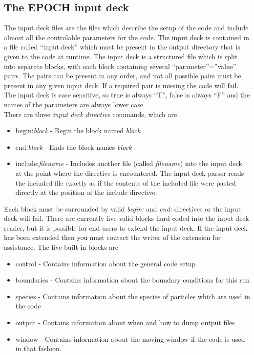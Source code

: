 \documentclass[12pt]{article}
\newcommand{\EPOCH}{{\color{warwickdark}\fontfamily{phv}\selectfont EPOCH} }
\begin{document}
\subsection{The \EPOCH input deck}
The input deck files are the files which describe the setup of the code and
include almost all the controlable parameters for the code. The input deck is
contained in a file called ``input.deck'' which must be present in the output
directory that is given to the code at runtime. The input deck is a structured
file which is split into separate blocks, with each block containing several
``parameter''=''value'' pairs. The pairs can be present in any order, and not
all possible pairs must be present in any given input deck. If a required pair
is missing the code will fail. The input deck is case sensitive, so true is
always ``T'', false is always ``F'' and the names of the parameters are always
lower case.\\

There are three {\it input deck directive} commands, which are
\begin{itemize}
\item begin:{\it block} - Begin the block named {\it block}
\item end:{\it block} - Ends the block names {\it block}
\item include:{\it filename} - Includes another file (called {\it filename})
  into the input deck at the point where the directive is encountered. The
  input deck parser reads the included file exactly as if the contents of the
  included file were pasted directly at the position of the include directive.
\end{itemize}
Each block must be surrounded by valid {\it begin:} and {\it end:} directives
or the input deck will fail. There are currently five valid blocks hard coded
into the input deck reader, but it is possible for end users to extend the
input deck. If the input deck has been extended then you must contact the
writer of the extension for assistance. The five built in blocks are
\begin{itemize}
\item control - Contains information about the general code setup
\item boundaries - Contains information about the boundary conditions for this
  run
\item species - Contains information about the species of particles which are
  used in the code
\item output - Contains information about when and how to dump output files
\item window - Contains information about the moving window if the code is
  used in that fashion.
\end{itemize}
\end{document}
